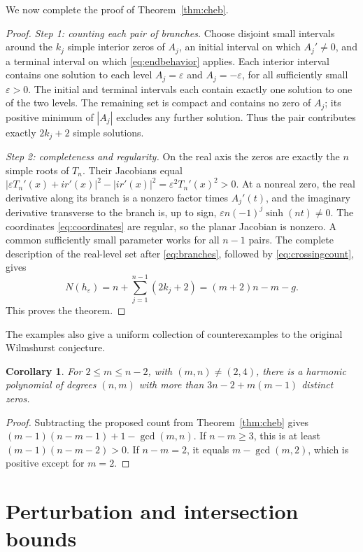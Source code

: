 \documentclass[a4paper]{amsart}
\newtheorem{cor}[thm]{Corollary}
\theoremstyle{remark}
\newcommand{\eps}{\varepsilon}
\begin{document}
We now complete the proof of Theorem~\ref{thm:cheb}.

\begin{proof}
\emph{Step 1: counting each pair of branches.}
Choose disjoint small intervals around the \(k_j\) simple interior
zeros of \(A_j\), an initial interval on which \(A_j'\ne0\),
and a terminal interval on which \eqref{eq:endbehavior} applies.
Each interior interval contains one solution to each level
\(A_j=\eps\) and \(A_j=-\eps\), for all sufficiently small
\(\eps>0\). The initial and terminal intervals each contain
exactly one solution to one of the two levels.
The remaining set is compact and contains no zero of \(A_j\);
its positive minimum of \(|A_j|\) excludes any further solution.
Thus the pair contributes exactly \(2k_j+2\) simple solutions.

\emph{Step 2: completeness and regularity.}
On the real axis the zeros are exactly the \(n\) simple roots of
\(T_n\). Their Jacobians equal
\(|\eps T_n'(x)+ir'(x)|^2-|ir'(x)|^2
=\eps^2T_n'(x)^2>0\).
At a nonreal zero, the real derivative along its branch is a
nonzero factor times \(A_j'(t)\), and the imaginary derivative
transverse to the branch is, up to sign,
\(\eps n(-1)^j\sinh(nt)\ne0\).
The coordinates \eqref{eq:coordinates} are regular, so the planar
Jacobian is nonzero. A common sufficiently small parameter works
for all \(n-1\) pairs.
The complete description of the real-level set after
\eqref{eq:branches}, followed by \eqref{eq:crossingcount}, gives
\[
 N(h_\eps)=n+\sum_{j=1}^{n-1}(2k_j+2)
          =(m+2)n-m-g.
\]
This proves the theorem.
\end{proof}

The examples also give a uniform collection of counterexamples to
the original Wilmshurst conjecture.

\begin{cor}\label{cor:wilm}
For \(2\le m\le n-2\), with \((m,n)\ne(2,4)\), there is a
harmonic polynomial of degrees \((n,m)\) with more than
\(3n-2+m(m-1)\) distinct zeros.
\end{cor}

\begin{proof}
Subtracting the proposed count from Theorem~\ref{thm:cheb} gives
\((m-1)(n-m-1)+1-\gcd(m,n)\).
If \(n-m\ge3\), this is at least
\((m-1)(n-m-2)>0\).
If \(n-m=2\), it equals \(m-\gcd(m,2)\), which is positive
except for \(m=2\).
\end{proof}

\section{Perturbation and intersection bounds}\label{sec:regular}
\end{document}
